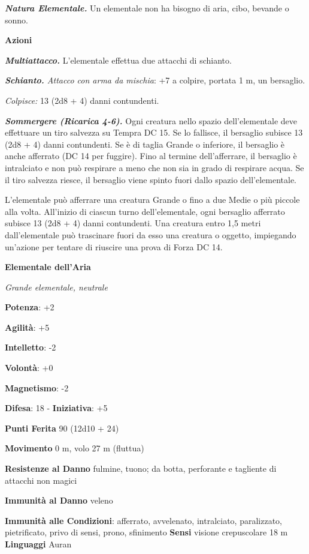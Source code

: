 \begin{multicols}{2}
\emph{\textbf{Natura Elementale.}} Un elementale non ha bisogno di aria,
cibo, bevande o sonno.

\smallskip\textbf{Azioni}

\emph{\textbf{Multiattacco.}} L'elementale effettua due attacchi di
schianto.

\emph{\textbf{Schianto.} Attacco con arma da mischia}: +7 a colpire,
portata 1 m, un bersaglio.

\emph{Colpisce:} 13 (2d8 + 4) danni contundenti.

\emph{\textbf{Sommergere (Ricarica 4-6).}} Ogni creatura nello spazio
dell'elementale deve effettuare un tiro salvezza su Tempra DC 15. Se lo
fallisce, il bersaglio subisce 13 (2d8 + 4) danni contundenti. Se è di
taglia Grande o inferiore, il bersaglio è anche afferrato (DC 14 per
fuggire). Fino al termine dell'afferrare, il bersaglio è intralciato e
non può respirare a meno che non sia in grado di respirare acqua. Se il
tiro salvezza riesce, il bersaglio viene spinto fuori dallo spazio
dell'elementale.

L'elementale può afferrare una creatura Grande o fino a due Medie o più
piccole alla volta. All'inizio di ciascun turno dell'elementale, ogni
bersaglio afferrato subisce 13 (2d8 + 4) danni contundenti. Una creatura
entro 1,5 metri dall'elementale può trascinare fuori da esso una
creatura o oggetto, impiegando un'azione per tentare di riuscire una
prova di Forza DC 14.



\textbf{Elementale dell'Aria}

\emph{Grande elementale, neutrale}

\textbf{Potenza}: +2

\textbf{Agilità}: +5

\textbf{Intelletto}: -2

\textbf{Volontà}: +0

\textbf{Magnetismo}: -2

\textbf{Difesa}: 18 - \textbf{Iniziativa}: +5

\textbf{Punti Ferita} 90 (12d10 + 24)

\textbf{Movimento} 0 m, volo 27 m (fluttua)

\textbf{Resistenze al Danno} fulmine, tuono; da botta, perforante e
tagliente di attacchi non magici

\textbf{Immunità al Danno} veleno

\textbf{Immunità alle Condizioni}: afferrato, avvelenato, intralciato,
paralizzato, pietrificato, privo di sensi, prono, sfinimento
\textbf{Sensi} visione crepuscolare 18 m
\textbf{Linguaggi} Auran


\end{multicols}
